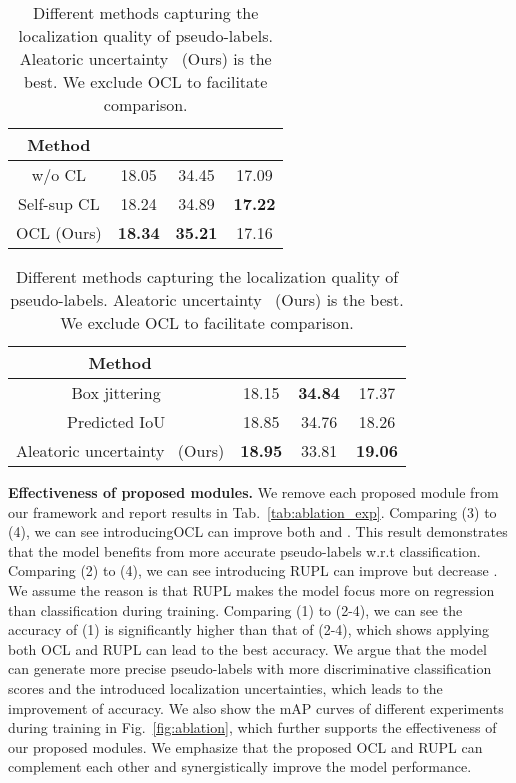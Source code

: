 \documentclass{bmvc2k}
\begin{document}
\begin{table}[t]
\begin{minipage}[b]{0.47\textwidth}\centering
    \scriptsize
    \begin{tabular}{c|ccc}
    \toprule
         Method &   &  &  \\
         \midrule
         w/o CL &  18.05 & 34.45 & 17.09\\
         Self-sup CL &  18.24 & 34.89 & \textbf{17.22}\\
         OCL (Ours) &  \textbf{18.34} & \textbf{35.21} & 17.16\\
    \bottomrule
    \end{tabular}
    \caption{Ablation studies of OCL. CL denotes contrastive learning. A pair in Self-sup CL is positive if and only if they are the same instance(i = j in Eq.~\ref{eq:confidence-aware pairing}). We exclude RUPL to facilitate the comparison.}
    \label{tab:self_semi_cont}
\end{minipage}\hfill \begin{minipage}[b]{0.47\textwidth}\centering
    \centering
    \tiny
    \begin{tabular}{c|ccc}
        \toprule
        Method &  &  &  \\
        \midrule
        Box jittering~\cite{xu2021soft} & 18.15 & \textbf{34.84} & 17.37 \\
        Predicted IoU~\cite{wang20213dioumatch} & 18.85 & 34.76 & 18.26 \\
        Aleatoric uncertainty~\cite{whatUncertainty} (Ours) & \textbf{18.95} & 33.81 & \textbf{19.06} \\
        \bottomrule
    \end{tabular}
    \caption{Different methods capturing the localization quality of pseudo-labels. Aleatoric uncertainty~\cite{whatUncertainty} (Ours) is the best. We exclude OCL to facilitate comparison.
    }
    \label{tab:measurement}
\end{minipage}\end{table}
\noindent\textbf{Effectiveness of proposed modules.} 
We remove each proposed module from our framework and report results in Tab.~\ref{tab:ablation_exp}.
Comparing (3) to (4), we can see introducingOCL can improve both  and . This result demonstrates that the model benefits from more accurate pseudo-labels w.r.t classification. Comparing (2) to (4), we can see introducing RUPL can improve  but decrease . We assume the reason is that RUPL makes the model focus more on regression than classification during training. Comparing (1) to (2-4), we can see the accuracy of (1) is significantly higher than that of (2-4), which shows applying both OCL and RUPL can lead to the best accuracy. We argue that the model can generate more precise pseudo-labels with more discriminative classification scores and the introduced localization uncertainties, which leads to the improvement of accuracy. We also show the mAP curves of different experiments during training in Fig.~\ref{fig:ablation}, which further supports the effectiveness of our proposed modules.
We emphasize that the proposed OCL and RUPL can complement each other and synergistically improve the model performance.
\end{document}
